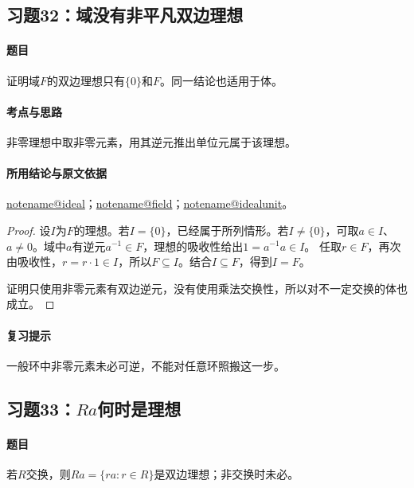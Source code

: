 \documentclass[UTF8,a4paper,11pt,fontset=windows]{ctexart}
\makeatletter
\newcommand{\noteref}[1]{\hyperref[note:#1]{\csname notename@#1\endcsname}}
\newcommand{\exref}[2]{\hyperref[ex:#1:#2]{第#1章习题#2}}
\makeatother
\begin{document}
\subsection{习题32：\texorpdfstring{域没有非平凡双边理想}{域没有非平凡双边理想}}
\label{ex:1:32}

\paragraph{题目}
证明域$F$的双边理想只有$\{0\}$和$F$。同一结论也适用于体。

\paragraph{考点与思路}
非零理想中取非零元素，用其逆元推出单位元属于该理想。

\paragraph{所用结论与原文依据}
\noteref{ideal}；\noteref{field}；\noteref{idealunit}。


\begin{proof}
设$I$为$F$的理想。若$I=\{0\}$，已经属于所列情形。若$I\ne\{0\}$，可取$a\in I$、$a\ne0$。域中$a$有逆元$a^{-1}\in F$，理想的吸收性给出$1=a^{-1}a\in I$。
任取$r\in F$，再次由吸收性，$r=r\cdot1\in I$，所以$F\subseteq I$。结合$I\subseteq F$，得到$I=F$。

证明只使用非零元素有双边逆元，没有使用乘法交换性，所以对不一定交换的体也成立。
\end{proof}

\paragraph{复习提示}
一般环中非零元素未必可逆，不能对任意环照搬这一步。


\subsection{习题33：\texorpdfstring{$Ra$何时是理想}{Ra何时是理想}}
\label{ex:1:33}

\paragraph{题目}
若$R$交换，则$Ra=\{ra:r\in R\}$是双边理想；非交换时未必。
\end{document}
